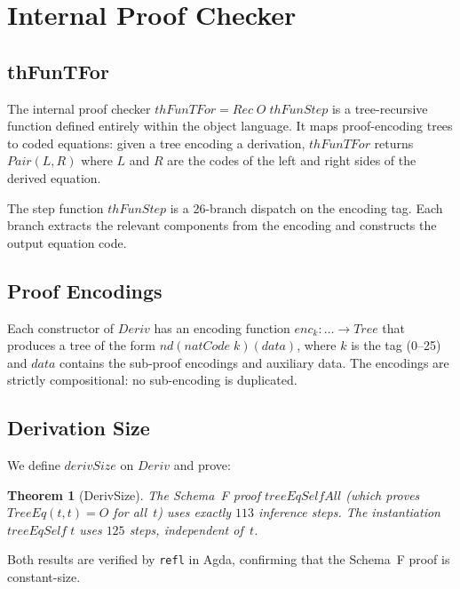 \documentclass[11pt]{article}
\newtheorem{theorem}{Theorem}
\begin{document}
\section{Internal Proof Checker}

\subsection{thFunTFor}

The internal proof checker $\mathit{thFunTFor} = \mathit{Rec}\;O\;\mathit{thFunStep}$
is a tree-recursive function defined entirely within the object language.
It maps proof-encoding trees to coded equations: given a tree encoding a
derivation, $\mathit{thFunTFor}$ returns $\mathit{Pair}(L, R)$ where
$L$ and $R$ are the codes of the left and right sides of the derived equation.

The step function $\mathit{thFunStep}$ is a 26-branch dispatch on the
encoding tag. Each branch extracts the relevant components from the
encoding and constructs the output equation code.

\subsection{Proof Encodings}

Each constructor of $\mathit{Deriv}$ has an encoding function
$\mathit{enc}_k : \ldots \to \mathit{Tree}$ that produces a tree of the
form $\mathit{nd}(\mathit{natCode}\;k)(\mathit{data})$, where $k$ is
the tag (0--25) and $\mathit{data}$ contains the sub-proof encodings
and auxiliary data. The encodings are strictly compositional: no
sub-encoding is duplicated.

\subsection{Derivation Size}

We define $\mathit{derivSize}$ on $\mathit{Deriv}$ and prove:

\begin{theorem}[DerivSize]
The Schema~F proof $\mathit{treeEqSelfAll}$ (which proves
$\mathit{TreeEq}(t,t) = O$ for all~$t$) uses exactly $113$ inference
steps. The instantiation $\mathit{treeEqSelf}\;t$ uses $125$ steps,
independent of~$t$.
\end{theorem}

Both results are verified by \texttt{refl} in Agda, confirming that the
Schema~F proof is constant-size.
\end{document}
